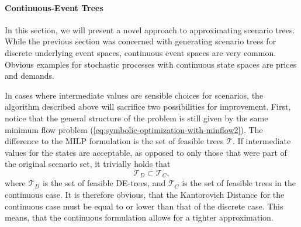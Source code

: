 \paragraph{Continuous-Event Trees} In this section, we will present a novel approach to approximating scenario trees. While the previous section was concerned with generating scenario trees for discrete underlying event spaces, continuous event spaces are very common. Obvious examples for stochastic processes with continuous state spaces are prices and demands.

In cases where intermediate values are sensible choices for scenarios, the algorithm described above will sacrifice two possibilities for improvement. First, notice that the general structure of the problem is still given by the same minimum flow problem (\ref{eq:symbolic-optimization-with-minflow2}). The difference to the MILP formulation is the set of feasible trees $\mathcal{T}$. If intermediate values for the states are acceptable, as opposed to only those that were part of the original scenario set, it trivially holds that
\begin{equation}
  \label{eq:T-D-subset-T-C}
  \mathcal{T}_D\subset \mathcal{T}_C,
\end{equation}
where $\mathcal{T}_D$ is the set of feasible DE-trees, and $\mathcal{T}_C$ is the set of feasible trees in the continuous case. It is therefore obvious, that the Kantorovich Distance for the continuous case must be equal to or lower than that of the discrete case. This means, that the continuous formulation allows for a tighter approximation.

